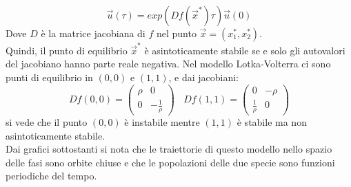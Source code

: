 \documentclass[12pt]{article}
\begin{document}
\begin{equation}
	\vec{u}(\tau) = exp(Df(\vec{x}^*)\tau)\vec{u}(0)
\end{equation}
Dove $D$ è la matrice jacobiana di $f$ nel punto $\vec{x} = (x^*_1,x^*_2)$. \\
Quindi, il punto di equilibrio $\vec{x}^*$ è asintoticamente stabile se e solo gli autovalori del jacobiano hanno parte reale negativa. Nel modello Lotka-Volterra ci sono punti di equilibrio in $(0,0)$ e $(1,1)$, e dai jacobiani:
$$
	Df(0,0) = \begin{pmatrix}
	\rho & 0 \\
	0 & -\frac{1}{\rho}
	\end{pmatrix} \ \ \ \ Df(1,1) = \begin{pmatrix}
	0 & -\rho \\
	\frac{1}{\rho} & 0
	\end{pmatrix}
$$
si vede che il punto $(0,0)$ è instabile mentre $(1,1)$ è stabile ma non asintoticamente stabile. \\
Dai grafici sottostanti si nota che le traiettorie di questo modello nello spazio delle fasi sono orbite chiuse e che le popolazioni delle due specie sono funzioni periodiche del tempo.
\end{document}
